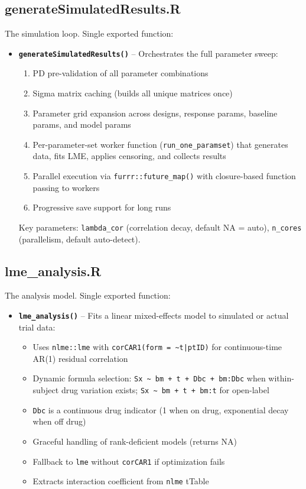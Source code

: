 \documentclass[11pt]{article}
\begin{document}
\subsection{generateSimulatedResults.R}

The simulation loop. Single exported function:

\begin{itemize}
  \item \textbf{\texttt{generateSimulatedResults()}} -- Orchestrates the full
    parameter sweep:
    \begin{enumerate}
      \item PD pre-validation of all parameter combinations
      \item Sigma matrix caching (builds all unique matrices once)
      \item Parameter grid expansion across designs, response
        params, baseline params, and model params
      \item Per-parameter-set worker function
        (\texttt{run\_one\_paramset}) that generates data, fits LME,
        applies censoring, and collects results
      \item Parallel execution via \texttt{furrr::future\_map()} with
        closure-based function passing to workers
      \item Progressive save support for long runs
    \end{enumerate}

    Key parameters: \texttt{lambda\_cor} (correlation decay, default
    NA = auto), \texttt{n\_cores} (parallelism, default auto-detect).
\end{itemize}

\subsection{lme\_analysis.R}

The analysis model. Single exported function:

\begin{itemize}
  \item \textbf{\texttt{lme\_analysis()}} -- Fits a linear mixed-effects model
    to simulated or actual trial data:
    \begin{itemize}
      \item Uses \texttt{nlme::lme} with \texttt{corCAR1(form = \~{}t|ptID)} for
        continuous-time AR(1) residual correlation
      \item Dynamic formula selection: \texttt{Sx \~{} bm + t + Dbc +
        bm:Dbc} when within-subject drug variation exists;
        \texttt{Sx \~{} bm + t + bm:t} for open-label
      \item \texttt{Dbc} is a continuous drug indicator (1 when on drug,
        exponential decay when off drug)
      \item Graceful handling of rank-deficient models (returns NA)
      \item Fallback to \texttt{lme} without \texttt{corCAR1} if optimization
        fails
      \item Extracts interaction coefficient from \texttt{nlme} tTable
    \end{itemize}
\end{itemize}
\end{document}
